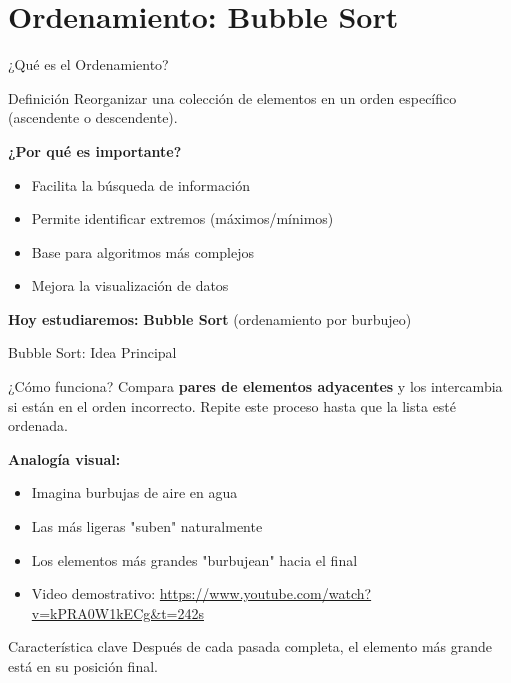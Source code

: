 \documentclass[10pt]{beamer}
\begin{document}
\section{Ordenamiento: Bubble Sort}

\begin{frame}{¿Qué es el Ordenamiento?}
  \begin{block}{Definición}
    Reorganizar una colección de elementos en un orden específico 
    (ascendente o descendente).
  \end{block}
  
  \vspace{0.3cm}
  \textbf{¿Por qué es importante?}
  \begin{itemize}
    \item Facilita la búsqueda de información
    \item Permite identificar extremos (máximos/mínimos)
    \item Base para algoritmos más complejos
    \item Mejora la visualización de datos
  \end{itemize}
  
  \vspace{0.3cm}
  \textbf{Hoy estudiaremos:} \textbf{Bubble Sort} (ordenamiento por burbujeo)
\end{frame}

\begin{frame}{Bubble Sort: Idea Principal}
  \begin{block}{¿Cómo funciona?}
    Compara \textbf{pares de elementos adyacentes} y los intercambia si están 
    en el orden incorrecto. Repite este proceso hasta que la lista esté ordenada.
  \end{block}
  
  \vspace{0.3cm}
  \textbf{Analogía visual:}
  \begin{itemize}
    \item Imagina burbujas de aire en agua
    \item Las más ligeras "suben" naturalmente
    \item Los elementos más grandes "burbujean" hacia el final
    \item Video demostrativo: \url{https://www.youtube.com/watch?v=kPRA0W1kECg&t=242s}  
  \end{itemize}
  
  \vspace{0.3cm}
  \begin{alertblock}{Característica clave}
    Después de cada pasada completa, el elemento más grande está en su posición final.
  \end{alertblock}
\end{frame}
\end{document}
